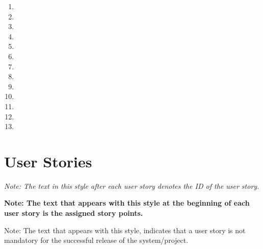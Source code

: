 \documentclass[12pt,titlepage]{article}
\newenvironment{storyPoint}
   {\color{blue} \bfseries}
   {}
\newenvironment{storyId}
   {\color{Bittersweet} \itshape}
   {}
\newenvironment{optionalStory}
   {\color[rgb]{0.015625,0.2890625,0.046875}}
   {}
\begin{document}
\begin{enumerate}
   \item \epicOne{}
   \item \epicTwo{}
   \item \epicThree{} 
   \item \epicFour{}
   \item \epicFive{}
   \item \epicSix{}
   \item \epicSeven{} 
   \item \epicEight{}
   \item \epicNine{}
   \item \epicTen{}
   \item \epicEleven{} 
   \item \epicTwelve{}
   \item \epicThirteen{}
\end{enumerate}

\section{User Stories}

\begin{storyId}
Note: The text in this style after each user story denotes the ID of the user
story.
\end{storyId}

\begin{storyPoint}
Note: The text that appears with this style at the beginning of each user story
is the assigned story points.
\end{storyPoint}

\begin{optionalStory}
Note: The text that appears with this style, indicates that a user story is not
mandatory for the successful release of the system/project.
\end{optionalStory}

\subsection{\epicOne{}}
\end{document}
